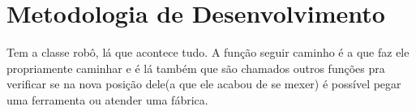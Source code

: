 \documentclass[12pt]{article}
\begin{document}
%


\section{Metodologia de Desenvolvimento} \label{sec:Desenvolv}
	Tem a classe robô, lá que acontece tudo.
A função seguir caminho
	 é a que faz ele propriamente caminhar
	 e é lá também que são chamados outros funções pra verificar se na nova posição dele(a que ele acabou de se mexer) é possível pegar uma ferramenta ou atender uma fábrica. 
	 
\end{document}
